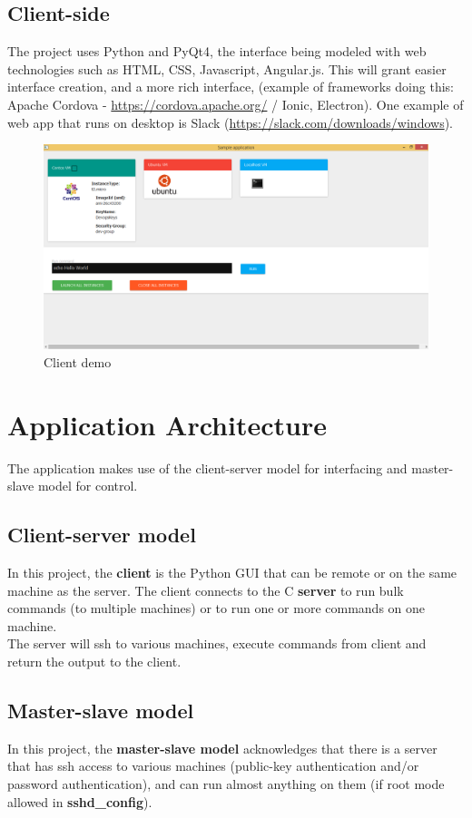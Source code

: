 \documentclass{llncs}
\begin{document}
\subsection{Client-side}

The project uses Python and PyQt4, the interface being modeled with web technologies such as HTML, CSS, Javascript, Angular.js. This will grant easier interface creation, and a more rich interface, (example of frameworks doing this: Apache Cordova - \url{https://cordova.apache.org/} / Ionic, Electron). One example of web app that runs on desktop is Slack (\url{https://slack.com/downloads/windows}).

\begin{figure}[!h]
	\label{fig:example}
	\includegraphics[scale=0.35]{client.png}
	\centering
	\caption{Client demo}
\end{figure}

\FloatBarrier
%
\section{Application Architecture}
%
The application makes use of the client-server model for interfacing and master-slave model for control.

\subsection{Client-server model}
In this project, the \textbf{client} is the Python GUI that can be remote or on the same machine as the server. The client connects to the C \textbf{server} to run bulk commands (to multiple machines) or to run one or more commands on one machine.\\
The server will ssh to various machines, execute commands from client and return the output to the client.

\subsection{Master-slave model}
In this project, the \textbf{master-slave model} acknowledges that there is a server that has ssh access to various machines (public-key authentication and/or password authentication), and can run almost anything on them (if root mode allowed in \textbf{sshd\_config}).
\end{document}
